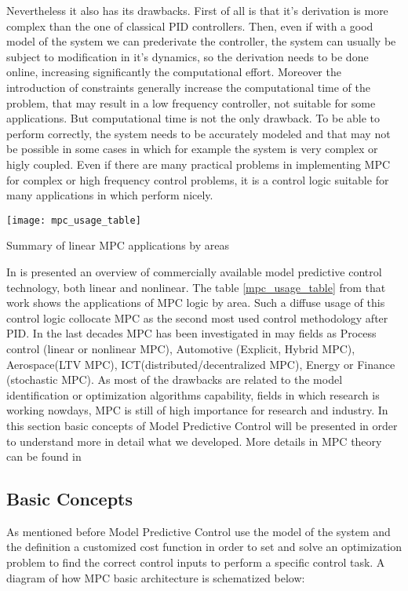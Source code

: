 Nevertheless it also has its drawbacks. First of all is that it's derivation is more complex than the one of classical PID controllers. Then, even if with a good model of the system we can prederivate the controller, the system can usually be subject to modification in it's dynamics, so the derivation needs to be done online, increasing significantly the computational effort. Moreover the introduction of constraints generally increase the computational time of the problem, that may result in a low frequency controller, not suitable for some applications.
But computational time is not the only drawback. To be able to perform correctly, the system needs to be accurately modeled and that may not be possible in some cases in which for example the system is very complex or higly coupled.
Even if there are many practical problems in implementing MPC for complex or high frequency control problems, it is a control logic suitable for many applications in which perform nicely. 
\begin{table}
	\centering
	\texttt{[image: mpc\_usage\_table]}
	\caption{Summary of linear MPC applications by areas}
	\label{mpc_usage_table}
\end{table}

In \cite{qin2003survey} is presented an overview of commercially available model predictive control technology, both linear and
nonlinear. The table \ref{mpc_usage_table} from that work shows the applications of MPC logic by area. Such a diffuse usage of this control logic collocate MPC as the second most used control methodology after PID. In the last decades MPC has been investigated in may fields as Process control (linear or nonlinear MPC), Automotive (Explicit, Hybrid MPC), Aerospace(LTV MPC), ICT(distributed/decentralized MPC), Energy or Finance (stochastic MPC).
As most of the drawbacks are related to the model identification or optimization algorithms capability, fields in which research is working nowdays, MPC is still of high importance for research and industry.
In this section basic concepts of Model Predictive Control will be presented in order to understand more in detail what we developed. More details in MPC theory can be found in \cite{camacho2013model}

\subsection{Basic Concepts}

As mentioned before Model Predictive Control use the model of the system and the definition a customized cost function in order to set and solve an optimization problem to find the correct control inputs to perform a specific control task.
A diagram of how MPC basic architecture is schematized below: \\
 
